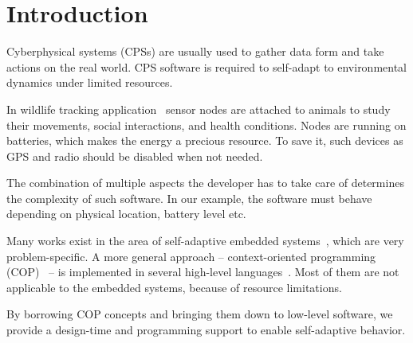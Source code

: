 \section{Introduction}

Cyberphysical systems (CPSs) are usually used to gather data form and take
actions on the real world. CPS software is required to self-adapt to
environmental dynamics under limited resources.

In wildlife tracking application~\cite{pasztor10:selective} sensor nodes are
attached to animals to study their movements, social interactions, and health
conditions. Nodes are running on batteries, which makes the energy a precious
resource. To save it, such devices as GPS and radio should be disabled when not
needed.

The combination of multiple aspects the developer has to take care of determines
the complexity of such software. In our example, the software must behave
depending on physical location, battery level etc.

Many works exist in the area of self-adaptive embedded
systems~\cite{Zimmerling12,Bourdenas11}, which are very problem-specific. A more
general approach -- context-oriented programming (COP)~\cite{Hirschfeld08} -- is
implemented in several high-level
languages~\cite{Ghezzi10,Salvaneschi12,Sehic11}. Most of them are not applicable
to the embedded systems, because of resource limitations.

By borrowing COP concepts and bringing them down to low-level software, we
provide a design-time and programming support to enable self-adaptive
behavior.
